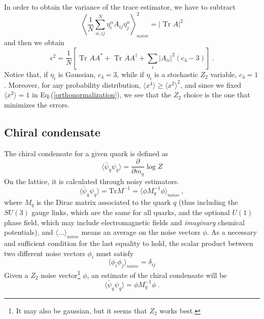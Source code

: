 In order to obtain the variance of the trace estimator, we have to subtract
\begin{equation}
 \left\langle \frac{1}{N} \sum^N_{\alpha,ij}  \eta^\alpha_i A_{ij} 
\eta^\alpha_j \right\rangle_{noise} ^2 = \left|\mbox{ Tr }  A \right|^2 
\end{equation}
and then we obtain
\begin{equation}
 \epsilon^2 =  \frac{1}{N} \left[
\mbox{ Tr } A A^\ast + \mbox{ Tr } A A^\dagger 
+ \sum_{i} \left|A_{ii}\right|^2 \left(c_4 -3 \right) \right] \ . 
\end{equation}
Notice that, if $\eta_i$ is Gaussian, $ c_4 = 3$, 
while if $\eta_i$ is a stochastic $Z_2$ variable, $ c_4 = 1$. Moreover, for 
any probability distribution, $\langle x^4 \rangle \geq \langle x^2 
\rangle ^2$, and since we fixed $\langle x^2 \rangle = 1$ in 
Eq.(\ref{orthonormalization}), we see that the $Z_2$ choice is the one 
that minimizes the errors.\\ 






\subsection{Chiral condensate}

The chiral condensate for a given quark is defined as 
\begin{equation}
 \langle \bar{\psi}_q \psi_q \rangle = \frac{\partial}{\partial m_q} \log Z
\end{equation}
On the lattice, it is calculated through noisy estimators. 
\begin{equation}
 \langle \bar{\psi}_q \psi_q \rangle  = \textrm{Tr} M^{-1} = \langle \phi 
M_q^{-1} \phi \rangle_{noise} \ , 
\end{equation}
where $M_q$ is the Dirac matrix associated to the 
quark $q$ (thus including the $SU(3)$ gauge links, which are the same for all 
quarks, and the optional $U(1)$ phase field, which may include electromagnetic 
fields and \emph{imaginary} chemical potentials), and $\langle \ldots 
\rangle_{noise}$ means an average on the noise vectors $\phi$. As a necessary 
and sufficient condition for the last equality to hold, the scalar product 
between two different noise vectors $\phi_i$ must satisfy
\begin{equation}
 \langle \phi_i \phi_j \rangle_{noise} = \delta_{ij}
\end{equation}
Given a $Z_2$ noise vector\footnote{It may also be 
gaussian, but it 
seems that $Z_2$ works best.} $\phi$, an estimate of the chiral condensate will 
be
\begin{equation}
 \langle \bar{\psi}_q \psi_q \rangle  = \phi M_q^{-1} \phi \ .
\end{equation}

